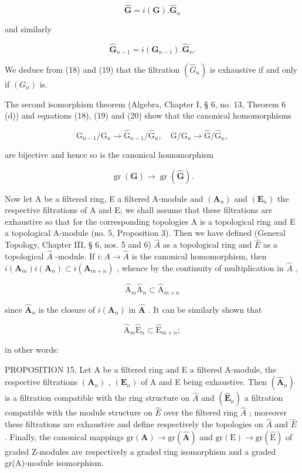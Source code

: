 \[
\hat {\mathbf {G}} = i (\mathbf {G}). \hat {\mathbf {G}} _ {n}\tag{19}
\]

and similarly

\[
\hat {\mathbf {G}} _ {n - 1} = i \left(\mathbf {G} _ {n - 1}\right). \hat {\mathbf {G}} _ {n}.\tag{20}
\]

We deduce from (18) and (19) that the filtration \((\hat{G}_n)\) is exhaustive if and only if \((G_n)\) is.

The second isomorphism theorem (Algebra, Chapter I, § 6, no. 13, Theorem 6 (d)) and equations (18), (19) and (20) show that the canonical homomorphisms

\[
\mathrm{G} _ {n - 1} / \mathrm{G} _ {n} \rightarrow \hat {\mathrm{G}} _ {n - 1} / \hat {\mathrm{G}} _ {n}, \quad \mathrm{G} / \mathrm{G} _ {n} \rightarrow \hat {\mathrm{G}} / \hat {\mathrm{G}} _ {n},\tag{21}
\]

are bijective and hence so is the canonical homomorphism

\[
\operatorname{gr} (\mathbf {G}) \rightarrow \operatorname{gr} (\hat {\mathbf {G}}).\tag{22}
\]

Now let A be a filtered ring, E a filtered A-module and \((\mathbf{A}_{n})\) and \((\mathbf{E}_{n})\) the respective filtrations of A and E; we shall assume that these filtrations are exhaustive so that for the corresponding topologies A is a topological ring and E a topological A-module (no. 5, Proposition 3). Then we have defined (General Topology, Chapter III, § 6, nos. 5 and 6) \(\hat{A}\) as a topological ring and \(\hat{E}\) as a topological \(\hat{A}\) -module. If \(i: A \to \hat{A}\) is the canonical homomorphism, then \(i(\mathbf{A}_{m})i(\mathbf{A}_{n}) \subset i(\mathbf{A}_{m+n})\) , whence by the continuity of multiplication in \(\hat{A}\) ,

\[
\hat {\mathrm{A}} _ {m} \hat {\mathrm{A}} _ {n} \subset \hat {\mathrm{A}} _ {m + n}\tag{23}
\]

since \(\hat{\mathbf{A}}_n\) is the closure of \(i(\mathbf{A}_n)\) in \(\hat{\mathbf{A}}\) . It can be similarly shown that

\[
\hat {\mathrm{A}} _ {m} \hat {\mathrm{E}} _ {n} \subset \hat {\mathrm{E}} _ {m + n};\tag{24}
\]

in other words:

PROPOSITION 15. Let A be a filtered ring and E a filtered A-module, the respective filtrations \((\mathbf{A}_{n})\) , \((\mathbf{E}_{n})\) of A and E being exhaustive. Then \((\hat{\mathbf{A}}_{n})\) is a filtration compatible with the ring structure on \(\hat{A}\) and \((\hat{\mathbf{E}}_{n})\) a filtration compatible with the module structure on \(\hat{E}\) over the filtered ring \(\hat{A}\) ; moreover these filtrations are exhaustive and define respectively the topologies on \(\hat{A}\) and \(\hat{E}\) . Finally, the canonical mappings \(\mathrm{gr}(\mathbf{A}) \to \mathrm{gr}(\hat{\mathbf{A}})\) and \(\mathrm{gr}(\mathrm{E}) \to \mathrm{gr}(\hat{\mathrm{E}})\) of graded Z-modules are respectively a graded ring isomorphism and a graded gr(A)-module isomorphism.

